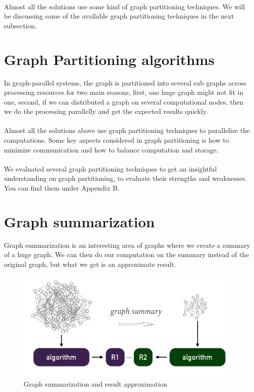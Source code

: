 \documentclass[12pt]{report}
\numberwithin{figure}{section}
\numberwithin{table}{section}
\begin{document}
\paragraph{}

Almost all the solutions use some kind of graph partitioning techniques. We will be discussing some of the available graph partitioning techniques in the next subsection.  

\section{Graph Partitioning algorithms}
In graph-parallel systems, the graph is partitioned into several sub graphs across processing resources for two main reasons, first, one huge graph might not fit in one, second, if we can distributed a graph on several computational nodes, then we do the processing parallelly and get the expected results quickly.  

\paragraph{}

Almost all the solutions above use graph partitioning techniques to parallelize the computations. Some key aspects considered in graph partitioning is how to minimize communication and how to balance computation and storage. 

\paragraph{}

We evaluated several graph partitioning techniques to get an insightful understanding on graph partitioning, to evaluate their strengths and weaknesses. You can find them under Appendix B. 

\section{Graph summarization}
Graph summarization is an interesting area of graphs where we create a summary of a huge graph. We can then do our computation on the summary instead of the original graph, but what we get is an approximate result. 

\begin{figure}[H]
\centering
\includegraphics[scale=0.6]{images/image02}
\caption{Graph summarization and result approximation}
\end{figure}
\end{document}
